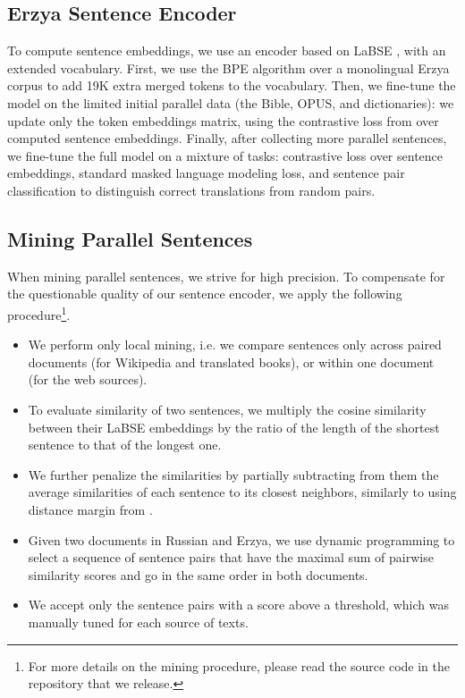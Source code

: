 \documentclass[11pt]{article}
\begin{document}
\subsection{Erzya Sentence Encoder}
\label{sec:encoder}
To compute sentence embeddings, we use an encoder based on LaBSE \cite{feng-etal-2022-language}, with an extended vocabulary. First, we use the BPE algorithm \cite{sennrich-etal-2016-neural} over a monolingual Erzya corpus to add 19K extra merged tokens to the vocabulary. Then, we fine-tune the model on the limited initial parallel data (the Bible, OPUS, and dictionaries): we update only the token embeddings matrix, using the contrastive loss from \citet{feng-etal-2022-language} over computed sentence embeddings. Finally, after collecting more parallel sentences, we fine-tune the full model on a mixture of tasks: contrastive loss over sentence embeddings, standard masked language modeling loss, and sentence pair classification to distinguish correct translations from random pairs.

\subsection{Mining Parallel Sentences}
\label{sec:mining}
When mining parallel sentences, we strive for high precision. To compensate for the questionable quality of our sentence encoder, we apply the following procedure\footnote{For more details on the mining procedure, please read the source code in the repository that we release.}. 

\begin{itemize}
    \item We perform only local mining, i.e. we compare sentences only across paired documents (for Wikipedia and translated books), or within one document (for the web sources).
    \item To evaluate similarity of two sentences, we multiply the cosine similarity between their LaBSE embeddings by the ratio of the length of the shortest sentence to that of the longest one. 
    \item We further penalize the similarities by partially subtracting from them the average similarities of each sentence to its closest neighbors, similarly to using distance margin from \citet{artetxe-schwenk-2019-margin}.
    \item Given two documents in Russian and Erzya, we use dynamic programming to select a sequence of sentence pairs that have the maximal sum of pairwise similarity scores and go in the same order in both documents.
    \item We accept only the sentence pairs with a score above a threshold, which was manually tuned for each source of texts.
\end{itemize}
\end{document}
